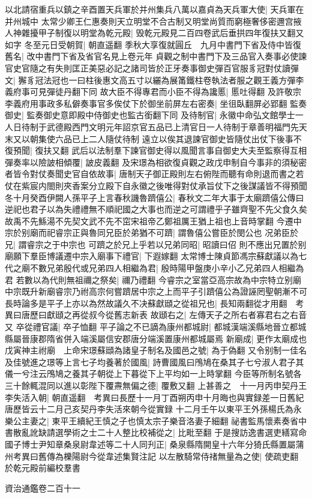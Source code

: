 以北請宿重兵以鎮之辛酉置天兵軍於并州集兵八萬以嘉貞為天兵軍大使|{
	天兵軍在并州城中}
太常少卿王仁惠奏則天立明堂不合古制又明堂尚質而窮極奢侈密邇宫掖人神雜擾甲子制復以明堂為乾元殿|{
	毁乾元殿見二百四卷武后垂拱四年復扶又翻又如字}
冬至元日受朝賀|{
	朝直遥翻}
季秋大享復就圓丘　九月中書門下省及侍中皆復舊名|{
	改中書門下省及省官名見上卷元年}
貞觀之制中書門下及三品官入奏事必使諫官史官隨之有失則匡正美惡必記之諸司皆於正牙奏事御史彈百官服豸冠對仗讀彈文|{
	獬豸冠法冠也一曰柱後惠文高五寸以纚為展筩鐵柱卷執法者服之觀王義方彈李義府事可見彈徒丹翻下同}
故大臣不得專君而小臣不得為讒慝|{
	慝吐得翻}
及許敬宗李義府用事政多私僻奏事官多俟仗下於御坐前屏左右密奏|{
	坐徂臥翻屏必郢翻}
監奏御史|{
	監奏御史意即殿中侍御史也監古銜翻下同}
及待制官|{
	永徽中命弘文館學士一人日待制于武德殿西門文明元年詔京官五品已上清官日一人待制于章善明福門先天末又以朝集使六品已上二人隨仗待制}
遠立以俟其退諫官御史皆隨仗出仗下後事不復預聞|{
	復扶又翻}
武后以法制羣下諫官御史得以風聞言事自御史大夫至監察得互相彈奏率以險詖相傾覆|{
	詖皮義翻}
及宋璟為相欲復貞觀之政戊申制自今事非的須秘密者皆令對仗奏聞史官自依故事|{
	唐制天子御正殿則左右俯陛而聽有命則退而書之若仗在紫宸内閤則夾香案分立殿下自永徽之後唯得對仗承旨仗下之後謀議皆不得預聞}
冬十月癸酉伊闕人孫平子上言春秋譏魯躋僖公|{
	春秋文二年大事于太廟躋僖公傳曰逆祀也君子以為失禮禮無不順祀國之大事也而逆之可謂禮乎子雖齊聖不先父食久矣故禹不先鯀湯不先契文武不先不窋宋祖帝乙鄭祖厲王猶上祖也上音時掌翻}
今遷中宗於别廟而祀睿宗正與魯同兄臣於弟猶不可躋|{
	謂魯僖公嘗臣於閔公也}
况弟臣於兄|{
	謂睿宗之于中宗也}
可躋之於兄上乎若以兄弟同昭|{
	昭讀曰佋}
則不應出兄置於别廟願下羣臣博議遷中宗入廟事下禮官|{
	下遐嫁翻}
太常博士陳貞節馮宗蘇獻議以為七代之廟不數兄弟殷代或兄弟四人相繼為君|{
	殷時陽甲盤庚小辛小乙兄弟四人相繼為君}
若數以為代則無祖禰之祭矣|{
	禰乃禮翻}
今睿宗之室當亞高宗故為中宗特立别廟中宗既升新廟睿宗乃祔高宗何嘗躋居中宗之上而平子引躋僖公為證誣罔聖朝漸不可長時論多是平子上亦以為然故議久不决蘇獻頲之從祖兄也|{
	長知兩翻從才用翻　考異曰唐歷曰獻頲之再從叔今從舊志新表}
故頲右之|{
	左傳天子之所右者寡君右之右音又}
卒從禮官議|{
	卒子恤翻}
平子論之不已謫為康州都城尉|{
	都城漢端溪縣地晉立都城縣屬晉康郡隋省併入端溪屬信安郡唐分端溪置康州都城屬焉}
新廟成|{
	更作太廟成也}
戊寅神主祔廟　上命宋璟蘇頲為諸皇子制名及國邑之號|{
	為于偽翻}
又令别制一佳名及佳號進之璟等上言七子均養著於國風|{
	詩曹國風曰鳲鳩在桑其子七兮淑人君子其儀一兮注云鳲鳩之養其子朝從上下暮從下上平均如一上時掌翻}
今臣等所制名號各三十餘輒混同以進以彰陛下覆燾無偏之德|{
	覆敷又翻}
上甚善之　十一月丙申契丹王李失活入朝|{
	朝直遥翻　考異曰長歷十一月丁酉朔丙申十月晦也與實録差一日舊紀唐歷皆云十二月己亥契丹李失活來朝今從實録}
十二月壬午以東平王外孫楊氏為永樂公主妻之|{
	東平王續紀王慎之子也慎太宗子樂音洛妻子細翻}
祕書監馬懷素奏省中書散亂訛缺請選學術之士二十人整比校補從之|{
	比毗至翻}
于是搜訪逸書選吏繕寫命國子博士尹知章桑泉尉韋述等二十人同刋正|{
	桑泉縣隋開皇十六年分猗氏縣置屬蒲州考異曰舊傳為櫟陽尉今從韋述集賢注記}
以左散騎常侍禇無量為之使|{
	使疏吏翻}
於乾元殿前編校羣書

資治通鑑卷二百十一
